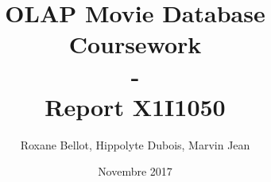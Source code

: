 \documentclass{report}
\begin{document}

\title{OLAP Movie Database Coursework\\
        -\\
        \huge{Report}
        \vskip1cm
        X1I1050
        }
\vskip2cm
\author{Roxane Bellot, Hippolyte Dubois, Marvin Jean}
\date{Novembre 2017}

%

\maketitle
\tableofcontents\begin{flushright}
\end{flushright}



\end{document}
